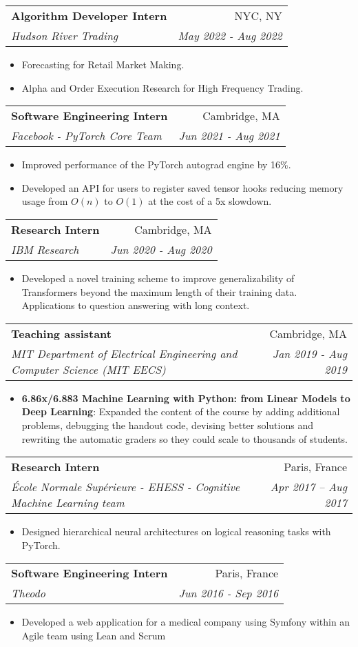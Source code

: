 \documentclass[letterpaper,10pt]{article}
\makeatletter
\newcommand{\resumeItem}[2]{
  \item\small{
    \textbf{#1}{: #2 \vspace{-2pt}}
  }
}
\newcommand{\resumeSubheading}[4]{
  \vspace{-1pt}\item[]
  \begin{tabular*}{0.98\textwidth}{l@{\extracolsep{\fill}}r}
      \hspace{-10pt}\textbf{#1} & #2 \\
      \hspace{-10pt}\textit{\small#3} & \textit{\small #4} \\
    \end{tabular*}\vspace{-5pt}
}
\newcommand{\resumeItemListStart}{\begin{itemize}}
\newcommand{\resumeItemListEnd}{\end{itemize}\vspace{-5pt}}
\makeatother
\begin{document}
    \resumeSubheading
      {Algorithm Developer Intern}{NYC, NY}
      {Hudson River Trading}{May 2022 - Aug 2022}
      \resumeItemListStart
          \item \small Forecasting for Retail Market Making.
          \item \small Alpha and Order Execution Research for High Frequency Trading.
      \resumeItemListEnd


    \resumeSubheading
      {Software Engineering Intern}{Cambridge, MA}
      {Facebook - PyTorch Core Team}{Jun 2021 - Aug 2021}
      \resumeItemListStart
          \item \small Improved performance of the PyTorch autograd engine by 16\%.
          \item \small Developed an API for users to register saved tensor hooks reducing memory usage from $O(n)$ to $O(1)$ at the cost of a 5x slowdown.
      \resumeItemListEnd


    \resumeSubheading
      {Research Intern}{Cambridge, MA}
      {IBM Research}{Jun 2020 - Aug 2020}
      \resumeItemListStart
        \item \small Developed a novel training scheme to improve generalizability of Transformers beyond the maximum length of their training data. Applications to question answering with long context.
      \resumeItemListEnd


    \resumeSubheading
      {Teaching assistant}{Cambridge, MA}
      {MIT Department of Electrical Engineering and Computer Science (MIT EECS)}{Jan 2019 - Aug 2019}
      \resumeItemListStart
      \resumeItem{6.86x/6.883 Machine Learning with Python: from Linear Models to Deep Learning}{Expanded the content of the course by adding additional problems, debugging the handout code, devising better solutions and rewriting the automatic graders so they could scale to thousands of students.}
      \resumeItemListEnd

    \resumeSubheading
      {Research Intern}{Paris, France}
      {École Normale Supérieure - EHESS - Cognitive Machine Learning team}{Apr 2017 -- Aug 2017}
      \resumeItemListStart
          \item \small Designed hierarchical neural architectures on logical reasoning tasks with PyTorch.
      \resumeItemListEnd

    \resumeSubheading
      {Software Engineering Intern}{Paris, France}
      {Theodo}{Jun 2016 - Sep 2016}
      \resumeItemListStart
        \item \small Developed a web application for a medical company using Symfony within an Agile team using Lean and Scrum
      \resumeItemListEnd
\end{document}
